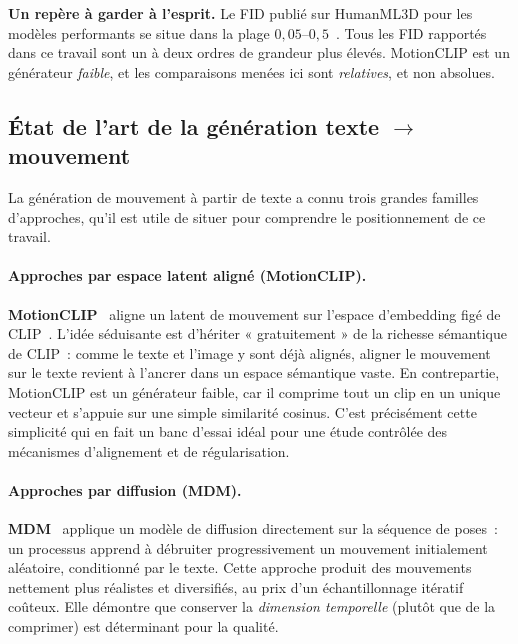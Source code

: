 \documentclass[12pt,a4paper,oneside]{report}
\theoremstyle{definition}
\theoremstyle{plain}
\begin{document}
\begin{encadre}
\textbf{Un repère à garder à l'esprit.} Le FID publié sur HumanML3D pour les
modèles performants se situe dans la plage $0{,}05$--$0{,}5$~\cite{guo2024momask}.
Tous les FID rapportés dans ce travail sont un à deux ordres de grandeur plus
élevés. MotionCLIP est un générateur \emph{faible}, et les comparaisons menées ici
sont \emph{relatives}, et non absolues.
\end{encadre}

\subsection{État de l'art de la génération texte \texorpdfstring{$\rightarrow$}{vers} mouvement}
\label{sub:etat-art}

La génération de mouvement à partir de texte a connu trois grandes familles
d'approches, qu'il est utile de situer pour comprendre le positionnement de ce
travail.

\paragraph{Approches par espace latent aligné (MotionCLIP).}
\textbf{MotionCLIP}~\cite{tevet2022motionclip} aligne un latent de mouvement sur
l'espace d'embedding figé de CLIP~\cite{radford2021clip}. L'idée séduisante est
d'hériter « gratuitement » de la richesse sémantique de CLIP~: comme le texte et
l'image y sont déjà alignés, aligner le mouvement sur le texte revient à l'ancrer
dans un espace sémantique vaste. En contrepartie, MotionCLIP est un générateur
faible, car il comprime tout un clip en un unique vecteur et s'appuie sur une
simple similarité cosinus. C'est précisément cette simplicité qui en fait un banc
d'essai idéal pour une étude contrôlée des mécanismes d'alignement et de
régularisation.

\paragraph{Approches par diffusion (MDM).}
\textbf{MDM}~\cite{tevet2023mdm} applique un modèle de diffusion directement sur la
séquence de poses~: un processus apprend à débruiter progressivement un mouvement
initialement aléatoire, conditionné par le texte. Cette approche produit des
mouvements nettement plus réalistes et diversifiés, au prix d'un échantillonnage
itératif coûteux. Elle démontre que conserver la \emph{dimension temporelle}
(plutôt que de la comprimer) est déterminant pour la qualité.
\end{document}
